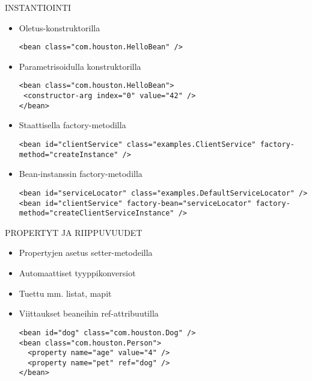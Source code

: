 \documentclass[hyperref={pdfauthor=\AUTHOR},14pt]{beamer}
\begin{document}
\begin{frame}[t, fragile]{INSTANTIOINTI}
\begin{itemize}
\item Oletus-konstruktorilla
\begin{lstlisting}
<bean class="com.houston.HelloBean" />
\end{lstlisting}
 \item Parametrisoidulla konstruktorilla
\begin{lstlisting}
<bean class="com.houston.HelloBean">
 <constructor-arg index="0" value="42" />
</bean>
\end{lstlisting}
 \item Staattisella factory-metodilla 
\begin{lstlisting}
<bean id="clientService" class="examples.ClientService" factory-method="createInstance" />
\end{lstlisting}
 \item Bean-instanssin factory-metodilla
\begin{lstlisting}
<bean id="serviceLocator" class="examples.DefaultServiceLocator" />
<bean id="clientService" factory-bean="serviceLocator" factory-method="createClientServiceInstance" />
\end{lstlisting}
\end{itemize}
\end{frame}
\begin{frame}[t, fragile]{PROPERTYT JA RIIPPUVUUDET }
\begin{itemize}
 \item Propertyjen asetus setter-metodeilla
 \item Automaattiset tyyppikonversiot
 \item Tuettu mm. listat, mapit
 \item Viittaukset beaneihin ref-attribuutilla
\begin{lstlisting}
<bean id="dog" class="com.houston.Dog" />
<bean class="com.houston.Person">
  <property name="age" value="4" />
  <property name="pet" ref="dog" />
</bean>
\end{lstlisting}
\end{itemize}
\end{frame}
\end{document}
